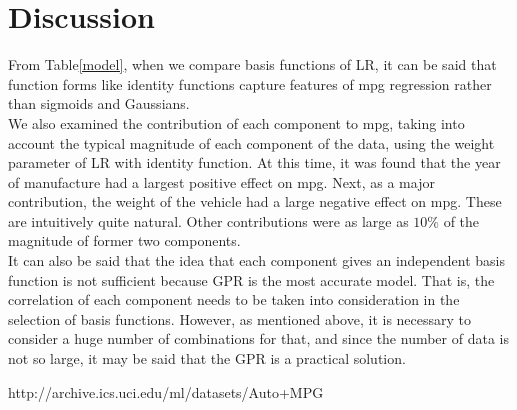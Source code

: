 \documentclass{article}
\begin{document}
\section{Discussion}
From Table\ref{model}, when we compare basis functions of LR, it can be said that function forms like identity functions capture features of mpg regression rather than sigmoids and Gaussians.\\
We also examined the contribution of each component to mpg, taking into account the typical magnitude of each component of the data, using the weight parameter of LR with identity function. At this time, it was found that the year of manufacture had a largest positive effect on mpg.
Next, as a major contribution, the weight of the vehicle had a large negative effect on mpg. These are intuitively quite natural. Other contributions were as large as $ 10 \% $ of the magnitude of former two components.\\
It can also be said that the idea that each component gives an independent basis function is not sufficient because GPR is the most accurate model.
That is, the correlation of each component needs to be taken into consideration in the selection of basis functions.
However, as mentioned above, it is necessary to consider a huge number of combinations for that, and since the number of data is not so large, it may be said that the GPR is a practical solution.

\begin{thebibliography}{9}
 http://archive.ics.uci.edu/ml/datasets/Auto+MPG
\end{thebibliography}
\end{document}
